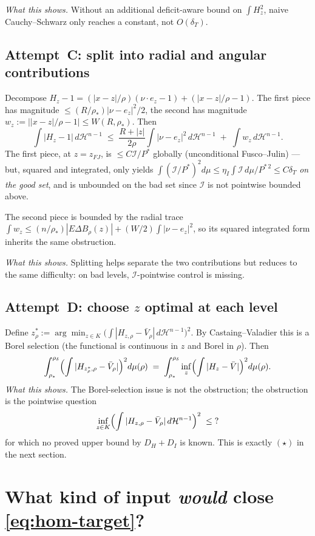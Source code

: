\documentclass[11pt]{article}
\theoremstyle{definition}
\newcommand{\rstar}{\rho_{*}}
\newcommand{\rdel}{\rho_\delta}
\newcommand{\Hn}{\mathcal H^{n-1}}
\begin{document}
\emph{What this shows.}  Without an additional deficit-aware bound on
$\int H_{z}^{2}$, naive Cauchy--Schwarz only reaches a constant, not
$O(\delta_{T})$.

\subsection{Attempt~C: split into radial and angular contributions}

Decompose $H_{z}-1=(|x-z|/\rho)(\nu\cdot e_{z}-1)+(|x-z|/\rho-1)$.  The
first piece has magnitude $\le (R/\rstar)|\nu-e_{z}|^{2}/2$, the
second has magnitude $w_{z}:=||x-z|/\rho-1|\le W(R,\rstar)$.  Then
\[
   \int|H_{z}-1|\,d\Hn
   \;\le\;\frac{R+|z|}{2\rho}\int|\nu-e_{z}|^{2}\,d\Hn
   \;+\;\int w_{z}\,d\Hn.
\]
The first piece, at $z=z_{FJ}$, is $\le C\mathcal I/P^{*}$ globally
(unconditional Fusco--Julin) — but, squared and integrated, only
yields $\int(\mathcal I/P^{*})^{2}d\mu\le\eta_{I}\int\mathcal I\,d\mu/P^{*\,2}\le C\delta_{T}$
\emph{on the good set}, and is unbounded on the bad set since
$\mathcal I$ is not pointwise bounded above.

The second piece is bounded by the radial trace
$\int w_{z}\le(n/\rstar)|E\Delta B_{\rho}(z)|+(W/2)\int|\nu-e_{z}|^{2}$,
so its squared integrated form inherits the same obstruction.

\emph{What this shows.}  Splitting helps separate the two
contributions but reduces to the same difficulty: on bad levels,
$\mathcal I$-pointwise control is missing.

\subsection{Attempt~D: choose $z$ optimal at each level}

Define $z_{\rho}^{*}:=\arg\min_{z\in K}\bigl(\int|H_{z,\rho}-\bar V_{\rho}|\,d\Hn\bigr)^{2}$.
By Castaing--Valadier this is a Borel selection (the functional is
continuous in $z$ and Borel in $\rho$).  Then
\[
   \int_{\rstar}^{\rdel}\Bigl(\int|H_{z_{\rho}^{*},\rho}-\bar V_{\rho}|\Bigr)^{2}d\mu(\rho)
   \;=\;\int_{\rstar}^{\rdel}\inf_{z}\Bigl(\int|H_{z}-\bar V|\Bigr)^{2}d\mu(\rho).
\]
\emph{What this shows.}  The Borel-selection issue is not the
obstruction; the obstruction is the pointwise question
\[
   \inf_{z\in K}\Bigl(\int|H_{z,\rho}-\bar V_{\rho}|\,d\Hn\Bigr)^{2}
   \;\le\;?
\]
for which no proved upper bound by $D_{H}+D_{I}$ is known.  This is
exactly $(\star)$ in the next section.

\section{What kind of input \emph{would} close \eqref{eq:hom-target}?}
\label{sec:wanted}
\end{document}
